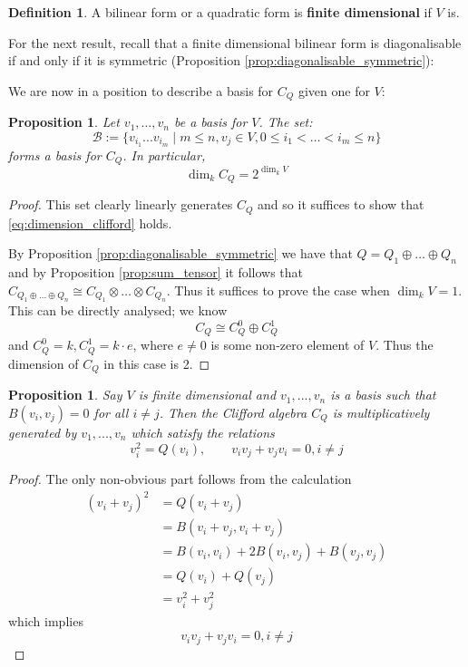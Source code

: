 \documentclass[12pt]{article}
\theoremstyle{plain}
\newtheorem{proposition}[thm]{Proposition}
\theoremstyle{definition}
\newtheorem{defn}[thm]{Definition} %
\newcommand{\scr}[1]{\mathscr{#1}}
\begin{document}
	\begin{defn}
		A bilinear form or a quadratic form is \textbf{finite dimensional} if $V$ is.
	\end{defn}
	For the next result, recall that a finite dimensional bilinear form is diagonalisable if and only if it is symmetric (Proposition \ref{prop:diagonalisable_symmetric}):
	
	We are now in a position to describe a basis for $C_Q$ given one for $V$:
	\begin{proposition}\label{prop:decomp_even_odd}
		Let $v_1,...,v_n$ be a basis for $V$. The set:
		\begin{equation}
			\scr{B} := \lbrace v_{i_1}...v_{i_m} \mid m \leq n, v_{j} \in V, 0 \leq i_1 < \hdots < i_m \leq n\rbrace
		\end{equation}
		forms a basis for $C_Q$. In particular,
		\begin{equation}\label{eq:dimension_clifford}
			\operatorname{dim}_kC_Q = 2^{\operatorname{dim}_kV}
		\end{equation}
	\end{proposition}
	\begin{proof}
		This set clearly linearly generates $C_Q$ and so it suffices to show that \eqref{eq:dimension_clifford} holds.
		
		By Proposition \ref{prop:diagonalisable_symmetric} we have that $Q = Q_1 \oplus \hdots \oplus Q_n$ and by Proposition \ref{prop:sum_tensor} it follows that $C_{Q_1 \oplus \hdots \oplus Q_n} \cong C_{Q_1} \otimes \hdots \otimes C_{Q_n}$. Thus it suffices to prove the case when $\operatorname{dim}_kV = 1$. This can be directly analysed; we know
		\begin{equation}
			C_Q \cong C^0_Q \oplus C^1_Q
		\end{equation}
		and $C^0_Q = k, C^1_Q = k\cdot e$, where $e \neq 0$ is some non-zero element of $V$. Thus the dimension of $C_Q$ in this case is 2.
	\end{proof}
	\begin{proposition}
		Say $V$ is finite dimensional and $v_1,...,v_n$ is a basis such that $B(v_i,v_j) = 0$ for all $i \neq j$. Then the Clifford algebra $C_Q$ is multiplicatively generated by $v_1,...,v_n$ which satisfy the relations
		\begin{equation}\label{eq:clifford_relations}
			v_i^2 = Q(v_i),\qquad v_iv_j + v_jv_i = 0, i \neq j
		\end{equation}
	\end{proposition}
	\begin{proof}
		The only non-obvious part follows from the calculation
		\begin{align*}
			(v_i + v_j)^2 &= Q(v_i + v_j)\\
			&= B(v_i + v_j, v_i + v_j)\\
			&= B(v_i,v_i) + 2B(v_i,v_j) + B(v_j,v_j)\\
			&= Q(v_i) + Q(v_j)\\
			&= v_i^2 + v_j^2
		\end{align*}
		which implies
		\begin{equation}
			v_iv_j + v_jv_i = 0, i \neq j
		\end{equation}
	\end{proof}
\end{document}
